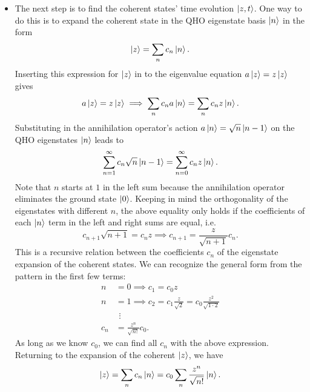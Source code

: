 \documentclass[11pt, a4paper]{article}
\begin{document}
\begin{itemize}
	\item The next step is to find the coherent states' time evolution $ \ket{z, t} $. One way to do this is to expand the coherent state in the QHO eigenstate basis $ \ket{n} $ in the form
	\begin{equation*}
		\ket{z} = \sum_{n} c_{n} \ket{n}.
	\end{equation*}
	Inserting this expression for $ \ket{z} $ in to the eigenvalue equation $ a \ket{z} = z \ket{z} $ gives
	\begin{equation*}
		a \ket{z} = z \ket{z} \implies  \sum_{n} c_{n} a \ket{n} = \sum_{n} c_{n} z \ket{n}.
	\end{equation*}
	Substituting in the annihilation operator's action  $ a \ket{n} = \sqrt{n}\ket{n-1} $ on the QHO eigenstates $ \ket{n} $ leads to
	\begin{equation*}
		 \sum_{n=1}^{\infty} c_{n} \sqrt{n} \ket{n - 1} =  \sum_{n=0}^{\infty} c_{n} z \ket{n}.
	\end{equation*}
	Note that $ n $ starts at $ 1 $ in the left sum because the annihilation operator eliminates the ground state $ \ket{0} $. Keeping in mind the orthogonality of the eigenstates with different $ n $, the above equality only holds if the coefficients of each $ \ket{n} $ term in the left and right sums are equal, i.e.
	\begin{equation*}
		c_{n+1} \sqrt{n+1} = c_{n}z \implies c_{n+1} = \frac{z}{\sqrt{n+1}}c_{n}.
	\end{equation*}
	This is a recursive relation between the coefficients $ c_{n} $ of the eigenstate expansion of the coherent states. We can recognize the general form from the pattern in the first few terms:
	\begin{align*}
		n &= 0 \implies c_{1} = c_{0}z\\
		n &= 1 \implies c_{2} = c_{1}\frac{z}{\sqrt{2}} = c_{0}\frac{z^{2}}{\sqrt{1 \cdot 2}}\\[-4mm]
		&{}\ \, \vdots\\[-4mm]
		c_{n} &= \frac{z^{n}}{\sqrt{n!}}c_{0}.
	\end{align*}
	As long as we know $ c_{0} $, we can find all $ c_{n} $ with the above expression. Returning to the expansion of the coherent $ \ket{z} $, we have
	\begin{equation*}
		\ket{z} = \sum_{n}c_{n} \ket{n} = c_{0} \sum_{n} \frac{z^{n}}{\sqrt{n!}}\ket{n}.
	\end{equation*}
	

\end{itemize}
\end{document}
